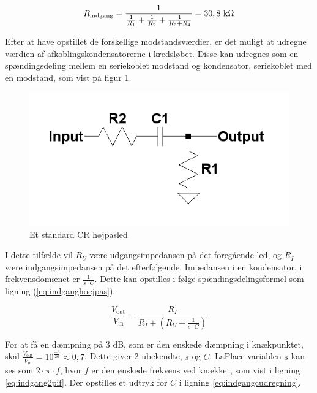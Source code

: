 
\begin{equation}
\label{eq:indgangrindgang}
R_{\mathrm{indgang}}=\frac{1}{\frac{1}{R_1}+\frac{1}{R_2}+\frac{1}{R_3+R_4}}=30,8~\mathrm{k}\ohm
\end{equation}

Efter at have opstillet de forskellige modstandsværdier, er det muligt at udregne værdien af afkoblingskondensatorerne i kredsløbet. Disse kan udregnes som en spændingsdeling mellem en seriekoblet modstand og kondensator, seriekoblet med en modstand, som vist på figur \ref{crvd}.
\begin{figure}[h]
\centering
\includegraphics[scale=0.4]{teknisk/indgangsvaelger/hoejpasfilter.png}
\caption{Et standard CR højpasled}
\label{crvd}
\end{figure}
 I dette tilfælde vil $R_U$ være udgangsimpedansen på det foregående led, og $R_I$ være indgangsimpedansen på det efterfølgende. Impedansen i en kondensator, i frekvensdomænet er $\frac{1}{s\cdot C}$. Dette kan opstilles i følge spændingsdelingsformel som ligning (\ref{eq:indganghoejpas}).

\begin{equation}
\label{eq:indganghoejpas}
\frac{V_{\mathrm{out}}}{V_{\mathrm{in}}}=\frac{R_I}{R_I+(R_U+\frac{1}{s\cdot C})}
\end{equation}

For at få en dæmpning på 3 dB, som er den ønskede dæmpning i knækpunktet, skal $\frac{V_{\mathrm{out}}}{V_{\mathrm{in}}}=10^{\frac{-3}{20}}\approx0,7$. 
Dette giver 2 ubekendte, $s$ og $C$. LaPlace variablen $s$ kan ses som $2\cdot \pi \cdot f$, hvor $f$ er den ønskede frekvens ved knækket, som vist i ligning \ref{eq:indgang2pif}. Der opstilles et udtryk for $C$ i ligning \ref{eq:indgangcudregning}.

